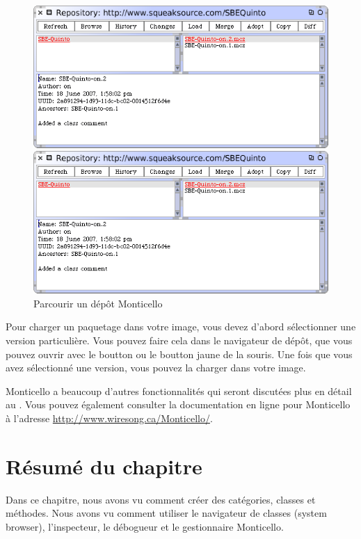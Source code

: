 \documentclass[a4paper,10pt,twoside]{book}
\begin{document}
\begin{figure}[hbt]
\ifluluelse
	{\centerline {\includegraphics[width=\textwidth]{BrowseRepository}}}
	{\centerline {\includegraphics[scale=0.7]{BrowseRepository}}}
\caption{Parcourir un dépôt Monticello
\label{fig:monticello3}}
\end{figure}


Pour charger un paquetage dans votre image, vous devez d'abord sélectionner une version particulière. Vous pouvez faire cela dans le navigateur de dépôt, que vous pouvez ouvrir avec le boutton  ou le boutton jaune de la souris. Une fois que vous avez sélectionné une version, vous pouvez la charger dans votre image.


Monticello a beaucoup d'autres fonctionnalités qui seront discutées plus en détail au .
Vous pouvez également consulter la documentation en ligne pour Monticello à l'adresse \url{http://www.wiresong.ca/Monticello/}.

\section{Résumé du chapitre}
Dans ce chapitre, nous avons vu comment créer des catégories, classes et méthodes. Nous avons vu comment utiliser le navigateur de classes (system browser), l'inspecteur, le débogueur et le gestionnaire Monticello.
\end{document}
